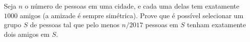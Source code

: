 Seja \(n\) o número de pessoas em uma cidade, e cada uma delas tem exatamente \(1000\) amigos (a amizade é sempre simétrica). Prove que é possível selecionar um grupo \(S\) de pessoas tal que pelo menos \(n/2017\) pessoas em \(S\) tenham exatamente dois amigos em \(S\).
